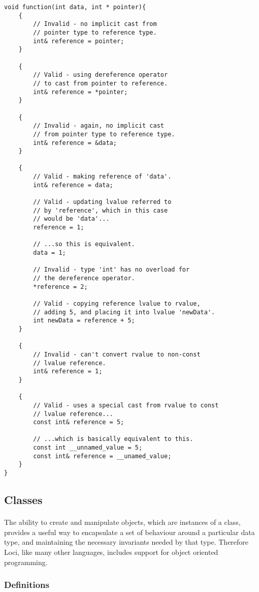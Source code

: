 \documentclass[12pt,twoside,notitlepage]{report}
\begin{document}
\begin{lstlisting}
void function(int data, int * pointer){
	{
		// Invalid - no implicit cast from
		// pointer type to reference type.
		int& reference = pointer;
	}
	
	{
		// Valid - using dereference operator
		// to cast from pointer to reference.
		int& reference = *pointer;
	}
	
	{
		// Invalid - again, no implicit cast
		// from pointer type to reference type.
		int& reference = &data;
	}
	
	{
		// Valid - making reference of 'data'.
		int& reference = data;
	
		// Valid - updating lvalue referred to
		// by 'reference', which in this case
		// would be 'data'...
		reference = 1;
		
		// ...so this is equivalent.
		data = 1;
		
		// Invalid - type 'int' has no overload for
		// the dereference operator.
		*reference = 2;
		
		// Valid - copying reference lvalue to rvalue,
		// adding 5, and placing it into lvalue 'newData'.
		int newData = reference + 5;
	}
	
	{
		// Invalid - can't convert rvalue to non-const
		// lvalue reference.
		int& reference = 1;
	}
	
	{	
		// Valid - uses a special cast from rvalue to const
		// lvalue reference...
		const int& reference = 5;
		
		// ...which is basically equivalent to this.
		const int __unnamed_value = 5;
		const int& reference = __unamed_value;
	}
}
\end{lstlisting}

\clearpage

\subsection{Classes}

\paragraph{}
The ability to create and manipulate objects, which are instances of a class, provides a useful way to encapsulate a set of behaviour around a particular data type, and maintaining the necessary invariants needed by that type. Therefore Loci, like many other languages, includes support for object oriented programming.

\subsubsection{Definitions}
\end{document}
